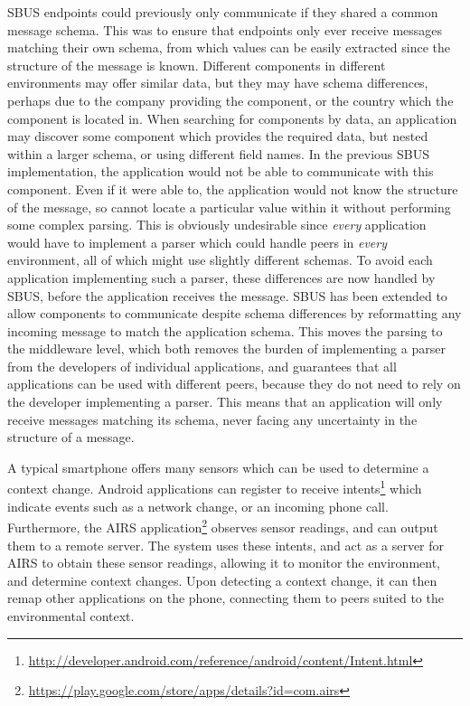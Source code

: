 \documentclass[12pt,twoside,notitlepage]{report}
\begin{document}
SBUS endpoints could previously only communicate if they shared a common message schema. 
This was to ensure that endpoints only ever receive messages matching their own schema, from which values can be easily extracted since the structure of the message is known. 
Different components in different environments may offer similar data, but they may have schema differences, perhaps due to the company providing the component, or the country which the component is located in. 
When searching for components by data, an application may discover some component which provides the required data, but nested within a larger schema, or using different field names. 
In the previous SBUS implementation, the application would not be able to communicate with this component. 
Even if it were able to, the application would not know the structure of the message, so cannot locate a particular value within it without performing some complex parsing. 
This is obviously undesirable since {\sl every} application would have to implement a parser which could handle peers in {\sl every} environment, all of which might use slightly different schemas.
To avoid each application implementing such a parser, these differences are now handled by SBUS, before the application receives the message. 
SBUS has been extended to allow components to communicate despite schema differences by reformatting any incoming message to match the application schema. 
This moves the parsing to the middleware level, which both removes the burden of implementing a parser from the developers of individual applications, and guarantees that all applications can be used with different peers, because they do not need to rely on the developer implementing a parser. 
This means that an application will only receive messages matching its schema, never facing any uncertainty in the structure of a message. 

A typical smartphone offers many sensors which can be used to determine a context change. 
Android applications can register to receive intents\footnote{\url{http://developer.android.com/reference/android/content/Intent.html}} which indicate events such as a network change, or an incoming phone call. 
Furthermore, the AIRS application\footnote{\url{https://play.google.com/store/apps/details?id=com.airs}} observes sensor readings, and can output them to a remote server.
The system uses these intents, and act as a server for AIRS to obtain these sensor readings, allowing it to monitor the environment, and determine context changes. 
Upon detecting a context change, it can then remap other applications on the phone, connecting them to peers suited to the environmental context. 
\end{document}
